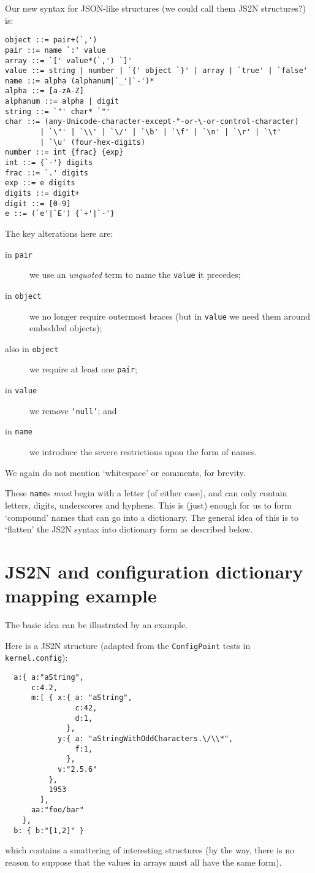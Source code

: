 \documentclass[a4paper,twoside,12pt]{article}
\begin{document}
Our new syntax for JSON-like structures (we could call them JS2N structures?) is:
\begin{verbatim}
object ::= pair+(`,')
pair ::= name `:' value
array ::= `[' value*(`,') `]'
value ::= string | number | `{' object `}' | array | `true' | `false'
name ::= alpha (alphanum|`_'|`-')*
alpha ::= [a-zA-Z]
alphanum ::= alpha | digit
string ::= `"' char* `"'
char ::= (any-Unicode-character-except-"-or-\-or-control-character)
        | `\"' | `\\' | `\/' | `\b' | `\f' | `\n' | `\r' | `\t'
        | `\u' (four-hex-digits)
number ::= int {frac} {exp}
int ::= {`-'} digits
frac ::= `.' digits
exp ::= e digits
digits ::= digit+
digit ::= [0-9]
e ::= (`e'|`E') {`+'|`-'}
\end{verbatim}
The key alterations here are: 
\begin{description}
\item[in \texttt{pair}] we use an \emph{unquoted} term to name the \texttt{value} it precedes; 
\item[in \texttt{object}] we no longer require outermost braces (but in \texttt{value} we need them around embedded objects);
\item[also in \texttt{object}] we require at least one \texttt{pair};
\item[in \texttt{value}] we remove \texttt{`null'}; and
\item[in \texttt{name}] we introduce the severe restrictions upon the form of names.
\end{description}
We again do not mention `whitespace' or comments, for brevity.

These \texttt{name}s \emph{must} begin with a letter (of either case), and can only contain letters, digits, underscores and hyphens. This is (just) enough for us to form `compound' names that can go into a dictionary. The general idea of this is to `flatten' the JS2N syntax into dictionary form as described below.

\section{JS2N and configuration dictionary mapping example}
The basic idea can be illustrated by an example.

Here is a JS2N structure (adapted from the \texttt{ConfigPoint} tests in \texttt{kernel.config}):
\begin{verbatim}
  a:{ a:"aString", 
      c:4.2,
      m:[ { x:{ a: "aString",
                c:42,
                d:1,
              },
            y:{ a: "aStringWithOddCharacters.\/\\*",
                f:1,
              },
            v:"2.5.6"
          },
          1953
        ],
      aa:"foo/bar"
    },
  b: { b:"[1,2]" }
\end{verbatim}
which contains a smattering of interesting structures (by the way, there is no reason to suppose that the values in arrays must all have the same form).
\end{document}
